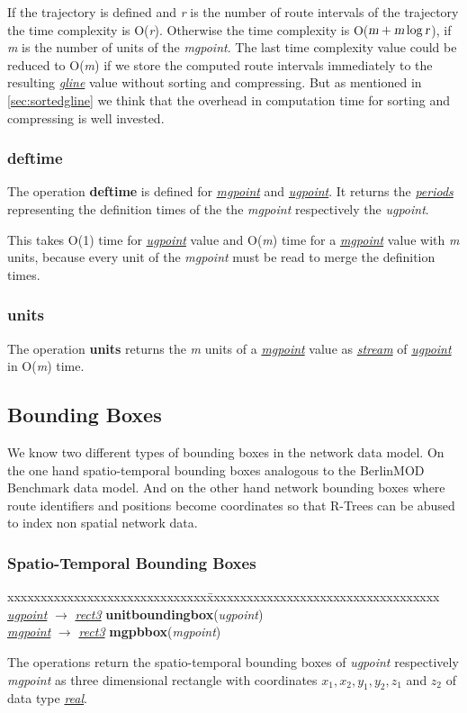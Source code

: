 \documentclass[a4paper]{article}
\newcommand{\bmodb} {BerlinMOD Benchmark}
\newcommand{\op}[1]{\textbf{#1}}
\newcommand{\var}[1]{\textsl{#1}}
\newcommand{\dt}[1]{\textsl{\underline{#1}}}
\begin{document}
If the trajectory is defined and \var{r} is the number of route intervals of the trajectory the time complexity is O(\var{r}). Otherwise the time complexity is O($\var{m} + \var{m} \log \var{r}$), if \var{m} is the number of units of the \var{mgpoint}. The last time complexity value could be reduced to O(\var{m}) if we store the computed route intervals immediately to the resulting \dt{gline} value without sorting and compressing. But as mentioned in \ref{sec:sortedgline} we think that the overhead in computation time for sorting and compressing is  well invested.
\subsubsection{\op{deftime}}
The operation \op{deftime} is defined for \dt{mgpoint} and \dt{ugpoint}. It returns the \dt{periods} representing the definition times of the the \var{mgpoint} respectively the \var{ugpoint}.

This takes O(1) time for \dt{ugpoint} value and O(\var{m}) time for a \dt{mgpoint} value with \var{m} units, because every unit of the \var{mgpoint} must be read to merge the definition times.
\subsubsection{\op{units}}
The operation \op{units} returns the \var{m} units of a \dt{mgpoint} value as \dt{stream} of \dt{ugpoint} in O(\var{m}) time.
\subsection{Bounding Boxes}
We know two different types of bounding boxes in the network data model. On the one hand spatio-temporal bounding boxes analogous to the \bmodb{} data model. And on the other hand network bounding boxes where route identifiers and positions become coordinates so that R-Trees can be abused to index non spatial network data.
\subsubsection{Spatio-Temporal Bounding Boxes}
\begin{tabbing}
xxxxxxxxxxxxxxxxxxxxxxxxxxxxxx\=xxxxxxxxxxxxxxxxxxxxxxxxxxxxxxxxxxx\kill
\dt{ugpoint} $\rightarrow$ \dt{rect3} \> \op{unitboundingbox}(\var{ugpoint})\\
\dt{mgpoint} $\rightarrow$ \dt{rect3} \> \op{mgpbbox}(\var{mgpoint})\\
\end{tabbing}
The operations return the spatio-temporal bounding boxes of \var{ugpoint} respectively \var{mgpoint} as three dimensional rectangle with coordinates $x_1, x_2, y_1, y_2, z_1$ and $z_2$ of data type \dt{real}.
\end{document}
